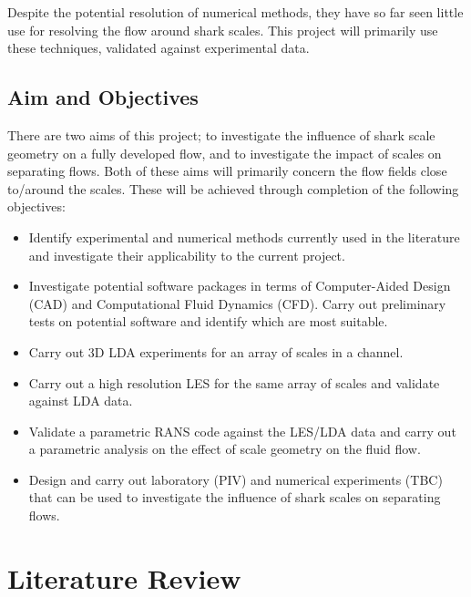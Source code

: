 \documentclass[12pt,oneside,a4paper]{article}
\begin{document}
Despite the potential resolution of numerical methods, they have so far seen little use for resolving the flow around shark scales. This project will primarily use these techniques, validated against experimental data.

\subsection{Aim and Objectives}
\label{section:AandO}

There are two aims of this project; to investigate the influence of shark scale geometry on a fully developed flow, and to investigate the impact of scales on separating flows. Both of these aims will primarily concern the flow fields close to/around the scales. These will be achieved through completion of the following objectives:
\begin{itemize}
\itemsep0em

\item Identify experimental and numerical methods currently used in the literature and investigate their applicability to the current project.

\item Investigate potential software packages in terms of Computer-Aided Design (CAD) and Computational Fluid Dynamics (CFD). Carry out preliminary tests on potential software and identify which are most suitable. 

\item Carry out 3D LDA experiments for an array of scales in a channel.

\item Carry out a high resolution LES for the same array of scales and validate against LDA data. 

\item Validate a parametric RANS code against the LES/LDA data and carry out a parametric analysis on the effect of scale geometry on the fluid flow. 

\item Design and carry out laboratory (PIV) and numerical experiments (TBC) that can be used to investigate the influence of shark scales on separating flows.  

\end{itemize}

\section{Literature Review}
\label{section:literatureReview}
\end{document}
